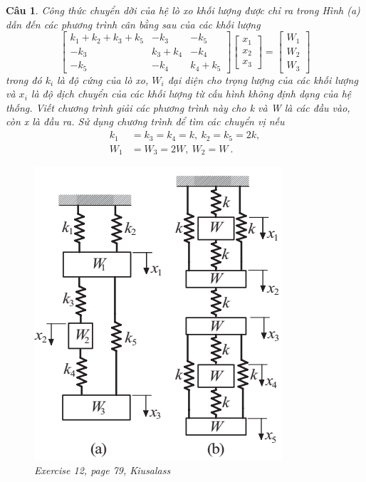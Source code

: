 \documentclass[11pt]{article}
\newtheorem{bt}{Câu}
\newcommand{\m}[1]{\begin{bmatrix}
		#1
\end{bmatrix}}
\begin{document}
\begin{bt}
Công thức chuyển dời của hệ lò xo khối lượng được chỉ ra trong Hình (a) dẫn đến các phương trình cân bằng sau của các khối lượng
%
\[
\m{	k_1 + k_2 + k_3 + k_5 & -k_3 & -k_5 \\
	-k_3 & k_3 + k_4 & -k_4 \\
	-k_5 & -k_4 & k_4 + k_5
}
\m{	x_1 \\
	x_2 \\
	x_3
}
=
\m{ W_1 \\ W_2 \\ W_3}
\]
%
trong đó $k_i$ là độ cứng của lò xo, $W_i$ đại diện cho trọng lượng của các khối lượng và $x_i$ là độ dịch chuyển của các khối lượng từ cấu hình không định dạng của hệ thống. Viết chương trình giải các phương trình này cho k và W là các đầu vào, còn x là đầu ra. 
Sử dụng chương trình để tìm các chuyển vị nếu
\begin{align*}
k_1 &= k_3 = k_4 = k, \ k_2 = k_5 = 2k, \\
W_1 &= W_3 = 2W, \ W_2 = W \ .
\end{align*}

\begin{figure}[h!]
	\centering
	\includegraphics[width=0.3\linewidth]{mass_spring}
	\caption{Exercise 12, page 79, Kiusalass}
	\label{fig:massspring}
\end{figure}
\end{bt}
\end{document}
